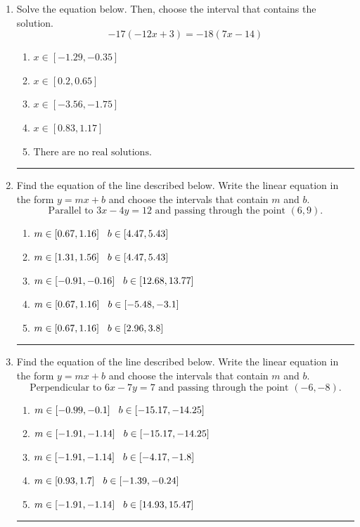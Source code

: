 \documentclass[14pt]{extbook}
\newcommand{\litem}[1]{\item#1\hspace*{-1cm}\rule{\textwidth}{0.4pt}}
\begin{document}
\begin{enumerate}
\litem{
Solve the equation below. Then, choose the interval that contains the solution.\[ -17(-12x + 3) = -18(7x -14) \]\begin{enumerate}[label=\Alph*.]
\item \( x \in [-1.29, -0.35] \)
\item \( x \in [0.2, 0.65] \)
\item \( x \in [-3.56, -1.75] \)
\item \( x \in [0.83, 1.17] \)
\item \( \text{There are no real solutions.} \)

\end{enumerate} }
\litem{
Find the equation of the line described below. Write the linear equation in the form $ y=mx+b $ and choose the intervals that contain $m$ and $b$.\[ \text{Parallel to } 3 x - 4 y = 12 \text{ and passing through the point } (6, 9). \]\begin{enumerate}[label=\Alph*.]
\item \( m \in [0.67, 1.16] \hspace*{3mm} b \in [4.47, 5.43] \)
\item \( m \in [1.31, 1.56] \hspace*{3mm} b \in [4.47, 5.43] \)
\item \( m \in [-0.91, -0.16] \hspace*{3mm} b \in [12.68, 13.77] \)
\item \( m \in [0.67, 1.16] \hspace*{3mm} b \in [-5.48, -3.1] \)
\item \( m \in [0.67, 1.16] \hspace*{3mm} b \in [2.96, 3.8] \)

\end{enumerate} }
\litem{
Find the equation of the line described below. Write the linear equation in the form $ y=mx+b $ and choose the intervals that contain $m$ and $b$.\[ \text{Perpendicular to } 6 x - 7 y = 7 \text{ and passing through the point } (-6, -8). \]\begin{enumerate}[label=\Alph*.]
\item \( m \in [-0.99, -0.1] \hspace*{3mm} b \in [-15.17, -14.25] \)
\item \( m \in [-1.91, -1.14] \hspace*{3mm} b \in [-15.17, -14.25] \)
\item \( m \in [-1.91, -1.14] \hspace*{3mm} b \in [-4.17, -1.8] \)
\item \( m \in [0.93, 1.7] \hspace*{3mm} b \in [-1.39, -0.24] \)
\item \( m \in [-1.91, -1.14] \hspace*{3mm} b \in [14.93, 15.47] \)


\end{enumerate}}
\end{enumerate}
\end{document}
